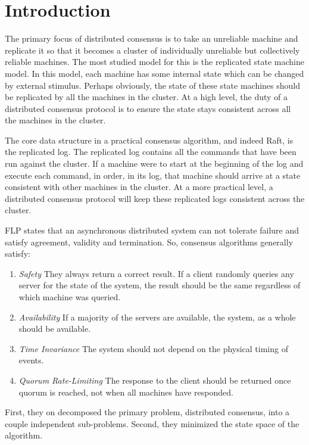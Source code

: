 \section{Introduction}

The primary focus of distributed consensus is to take an unreliable machine and replicate it so that it becomes a cluster of individually unreliable but collectively reliable machines.
The most studied model for this is the replicated state machine model.
In this model, each machine has some internal state which can be changed by external stimulus.
Perhaps obviously, the state of these state machines should be replicated by all the machines in the cluster.
At a high level, the duty of a distributed consensus protocol is to ensure the state stays consistent across all the machines in the cluster.

The core data structure in a practical consensus algorithm, and indeed Raft, is the replicated log.
The replicated log contains all the commands that have been run against the cluster.
If a machine were to start at the beginning of the log and execute each command, in order, in its log, that machine should arrive at a state consistent with other machines in the cluster.
At a more practical level, a distributed consensus protocol will keep these replicated logs consistent across the cluster.

FLP states that an asynchronous distributed system can not tolerate failure and satisfy agreement, validity and termination. \cite{flp-theorem}
So, consensus algorithms generally satisfy:
\begin{enumerate}
    \item \textit{Safety} They always return a correct result.
    If a client randomly queries any server for the state of the system, the result should be the same regardless of which machine was queried.
    \item \textit{Availability} If a majority of the servers are available, the system, as a whole should be available.
    \item \textit{Time Invariance} The system should not depend on the physical timing of events.
    \item \textit{Quorum Rate-Limiting} The response to the client should be returned once quorum is reached, not when all machines have responded.
\end{enumerate}


First, they on decomposed the primary problem, distributed consensus, into a couple independent sub-problems.
Second, they minimized the state space of the algorithm.

